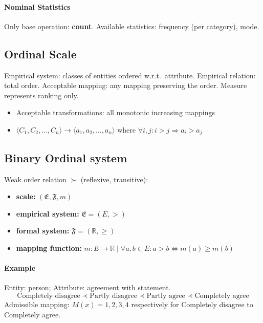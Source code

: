 \paragraph{Nominal Statistics}
Only base operation: \textbf{count}. Available statistics: frequency (per category), mode.

\subsection{Ordinal Scale}

Empirical system: classes of entities ordered w.r.t.\ attribute. Empirical relation: total order.
Acceptable mapping: any mapping preserving the order. Measure represents ranking only.
\begin{itemize}
  \item Acceptable transformations: all monotonic increasing mappings
  \item $\langle C_1, C_2, \ldots, C_n \rangle \to \langle a_1, a_2, \ldots, a_n \rangle$
        where $\forall i, j : i > j \Rightarrow a_i > a_j$
\end{itemize}

\subsection{Binary Ordinal system}


Weak order relation $\succ$ (reflexive, transitive):

\begin{itemize}
  \item \textbf{scale:} $(\mathfrak{E},\mathfrak{F},m)$
  \item \textbf{empirical system:} $\mathfrak{E}=(E,>)$
  \item \textbf{formal system:} $\mathfrak{F}=(\mathbb{R},\ge)$
  \item \textbf{mapping function:} $m:E\rightarrow\mathbb{R} \mid \forall a,b\in E:a>b\iff m(a)\ge m(b)$
\end{itemize}

\paragraph{Example}
Entity: person; Attribute: agreement with statement.
\[
  \text{Completely disagree} \prec \text{Partly disagree} \prec \text{Partly agree} \prec \text{Completely agree}
\]
Admissible mapping: $M(x) = 1, 2, 3, 4$ respectively for Completely disagree to Completely agree.

